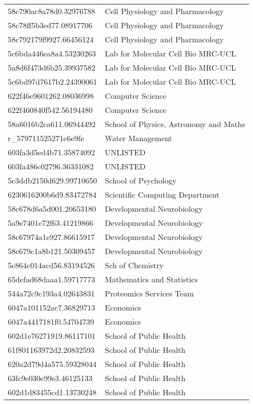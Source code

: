 \begin{tabular}{ll}
58c790ac8a78d0.32976788 & Cell Physiology and Pharmacology \\
58c78ff5b3ed77.08917706 & Cell Physiology and Pharmacology \\
58c792179f9927.66456124 & Cell Physiology and Pharmacology \\
5c6bda446ea8a4.53230263 & Lab for Molecular Cell Bio MRC-UCL \\
5a8d6f473d6b25.39937582 & Lab for Molecular Cell Bio MRC-UCL \\
5c6bd97d7617b2.24390061 & Lab for Molecular Cell Bio MRC-UCL \\
622f46e9601262.08036998 & Computer Science \\
622f460840f542.56194480 & Computer Science \\
58a6016b2ca611.06944492 & School of Physics, Astronomy and Maths \\
r_579711525271e6e9fe & Water Management \\
603fa3d5ed4b71.35874092 & UNLISTED \\
603fa486c02796.36331082 & UNLISTED \\
5c3ddb2150d629.99710650 & School of Psychology \\
6230616200b6d9.83472784 & Scientific Computing Department \\
58c678d6a5d001.20653180 & Developmental Neurobiology \\
5a9e7401e72f63.41219866 & Developmental Neurobiology \\
58c67974a1e927.86615917 & Developmental Neurobiology \\
58c679c1a8b121.50309457 & Developmental Neurobiology \\
5c864c014acd56.83194526 & Sch of Chemistry \\
65defad68daaa1.59717773 & Mathematics and Statistics \\
544a72c9c193a4.02643831 & Proteomics Services Team \\
6047a101152ac7.36829713 & Economics \\
6047a4417181f0.54704739 & Economics \\
602d1e76271919.86117101 & School of Public Health \\
61f801163972d2.20832593 & School of Public Health \\
620a2d79d4a575.59328044 & School of Public Health \\
63fc9e030e99e3.46125133 & School of Public Health \\
602d1d83455cd1.13730248 & School of Public Health \\

\end{tabular}
